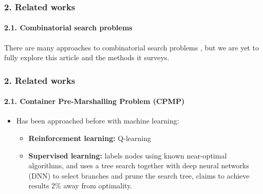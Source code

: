 \documentclass{beamer}
\begin{document}
\begin{frame}

\frametitle{2. Related works}
\framesubtitle{2.1. Combinatorial search problems}

There are many approaches to combinatorial search problems \cite{kotthoff2014}, but we are yet to fully explore this article and the methods it surveys.

\end{frame}

\begin{frame}

\frametitle{2. Related works}
\framesubtitle{2.1. Container Pre-Marshalling Problem (CPMP)}

\begin{itemize}
  \item Has been approached before with machine learning:
  \begin{itemize}
    \item \textbf{Reinforcement learning:} Q-learning \cite{hirashima2008}
    \item \textbf{Supervised learning:} \cite{hottung2020} labels nodes using known near-optimal algorithms, and uses a tree search together with deep neural networks (DNN) to select branches and prune the search tree, claims to achieve results 2\% away from optimality.
  \end{itemize}
\end{itemize}

\end{frame}
\end{document}
